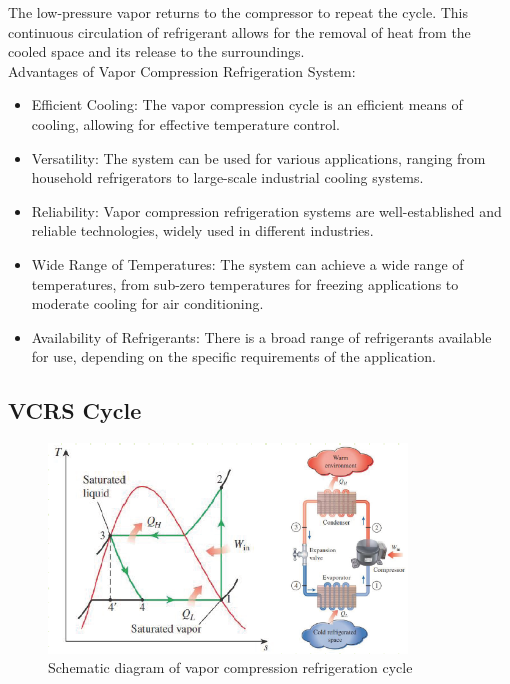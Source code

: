 \documentclass{article}
\begin{document}
The low-pressure vapor returns to the compressor to repeat the cycle. This continuous circulation of refrigerant allows for the removal of heat from the cooled space and its release to the surroundings.\\ 


Advantages of Vapor Compression Refrigeration System:
\begin{itemize}
  \item Efficient Cooling: The vapor compression cycle is an efficient means of cooling, allowing for effective temperature control.
  \item Versatility: The system can be used for various applications, ranging from household refrigerators to large-scale industrial cooling systems.
  \item Reliability: Vapor compression refrigeration systems are well-established and reliable technologies, widely used in different industries.
  \item Wide Range of Temperatures: The system can achieve a wide range of temperatures, from sub-zero temperatures for freezing applications to moderate cooling for air conditioning.
  \item Availability of Refrigerants: There is a broad range of refrigerants available for use, depending on the specific requirements of the application.
\end{itemize}

\subsection{VCRS Cycle}
\begin{figure}[htbp]
  \centering
  \includegraphics[width=0.85\textwidth]{img/vcrs_cycle.png}
  \caption{Schematic diagram of vapor compression refrigeration cycle}
  \label{fig:vcrs_cycle}
\end{figure}
\end{document}
